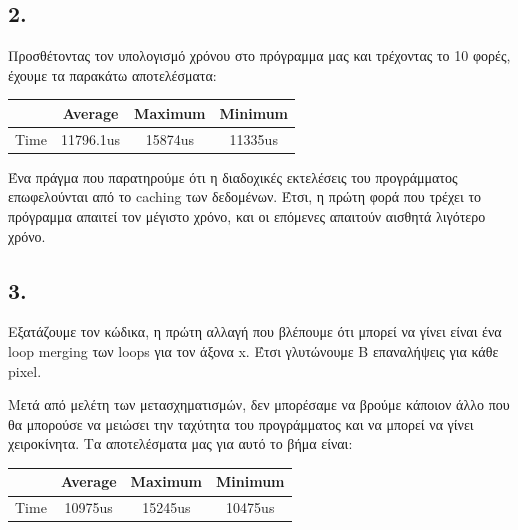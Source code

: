 \documentclass{article}
\newcommand{\english}[1]{\foreignlanguage{english}{{#1}}}
\begin{document}
\subsection*{2.}

Προσθέτοντας τον υπολογισμό χρόνου στο πρόγραμμα μας και τρέχοντας το 10 φορές, έχουμε τα παρακάτω αποτελέσματα: \\
\begin{otherlanguage}{english}
    \begin{center}
        \begin{tabular}{|c|c|c|c|}\hline
            & Average & Maximum & Minimum \\ \hline
            Time &  11796.1us & 15874us & 11335us\\ \hline
       \end{tabular}
    \end{center}
    \end{otherlanguage}

    Ένα πράγμα που παρατηρούμε ότι η διαδοχικές εκτελέσεις του προγράμματος επωφελούνται από το \english{caching} των δεδομένων. Έτσι, η πρώτη φορά που τρέχει το πρόγραμμα απαιτεί τον μέγιστο χρόνο, και οι επόμενες απαιτούν αισθητά λιγότερο χρόνο. 

\subsection*{3.}

Εξατάζουμε τον κώδικα, η πρώτη αλλαγή που βλέπουμε ότι μπορεί να γίνει είναι ένα \english{loop merging} των loops για τον άξονα x. Έτσι γλυτώνουμε \english{B} επαναλήψεις για κάθε \english{pixel}.

Μετά από μελέτη των μετασχηματισμών, δεν μπορέσαμε να βρούμε κάποιον άλλο που θα μπορούσε να μειώσει την ταχύτητα του προγράμματος και να μπορεί να γίνει χειροκίνητα. Τα αποτελέσματα μας για αυτό το βήμα είναι:

\begin{otherlanguage}{english}
    \begin{center}
        \begin{tabular}{|c|c|c|c|}\hline
            & Average & Maximum & Minimum \\ \hline
            Time &  10975us & 15245us & 10475us\\ \hline
       \end{tabular}
    \end{center}
    \end{otherlanguage}
\end{document}
